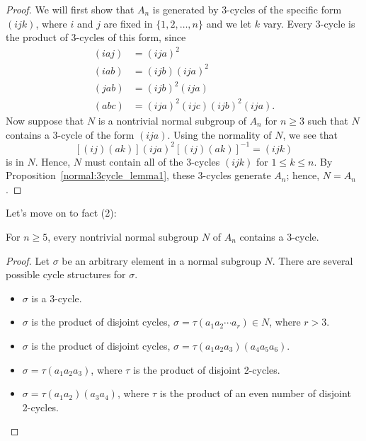 { 
\begin{proof}
We will first show that $A_n$ is generated by 3-cycles of the specific
form $(ijk)$, where $i$ and $j$ are fixed in  $\{ 1, 2, \ldots, n \}$
and we let $k$ vary. Every 3-cycle is the product of 3-cycles of this 
form, since
\begin{align*}
(i a j) & = (i j a)^2  \\
(i a b) & = (i j b) (i j a)^2 \\
(j a b) & = (i j b)^2 (i j a) \\
(a b c) & = (i j a)^2 (i j c) (i j b)^2 (i j a).
\end{align*}
Now suppose that $N$ is a nontrivial normal subgroup of $A_n$ for $n 
\geq 3$  such that $N$ contains a 3-cycle of the form $(i j a)$. Using
the normality of $N$, we see that
\[
[(i j)(a k)](i j a)^2 [(i j)(a k)]^{-1} = (i j k)
\]
is in $N$. Hence, $N$ must contain all of the 3-cycles $(i j k)$ 
for $1 \leq k \leq n$. By Proposition~\ref{normal:3cycle_lemma1}, these 3-cycles generate $A_n$; 
hence, $N = A_n$. 
\end{proof}
\bigskip
 
\noindent
Let's move on to fact (2):

\begin{thm}\label{normal:3cycle_lemma3}
For $n \geq 5$, every nontrivial normal subgroup $N$ of $A_n$ contains a
$3$-cycle. 
\end{thm}

 
 
\begin{proof}
Let $\sigma$ be an arbitrary element in a normal subgroup $N$. There
are several possible cycle structures for $\sigma$.
\begin{itemize}
 
\item
$\sigma$ is a 3-cycle.
 
\item
$\sigma$ is the product of disjoint cycles, $\sigma = \tau(a_1 a_2
\cdots a_r) \in N$, where $r >3$.
 
 
\item
$\sigma$ is the product of disjoint cycles, $\sigma = \tau(a_1 a_2
a_3)(a_4 a_5 a_6)$.
 
 
\item
$\sigma = \tau(a_1 a_2 a_3)$, where $\tau$ is the product of disjoint
2-cycles. 
 
 
\item
$\sigma =
\tau (a_1 a_2) (a_3 a_4) $, where $\tau$ is the product of an even
number of disjoint 2-cycles. 
 

\end{itemize}
\end{proof}}
